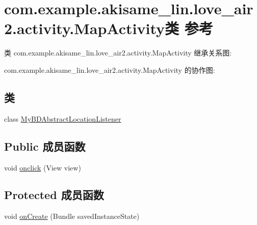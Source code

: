 \hypertarget{classcom_1_1example_1_1akisame__lin_1_1love__air2_1_1activity_1_1_map_activity}{}\section{com.\+example.\+akisame\+\_\+lin.\+love\+\_\+air2.\+activity.\+Map\+Activity类 参考}
\label{classcom_1_1example_1_1akisame__lin_1_1love__air2_1_1activity_1_1_map_activity}


类 com.\+example.\+akisame\+\_\+lin.\+love\+\_\+air2.\+activity.\+Map\+Activity 继承关系图\+:


com.\+example.\+akisame\+\_\+lin.\+love\+\_\+air2.\+activity.\+Map\+Activity 的协作图\+:
\subsection*{类}
\begin{DoxyCompactItemize}
\item 
class \mbox{\hyperlink{classcom_1_1example_1_1akisame__lin_1_1love__air2_1_1activity_1_1_map_activity_1_1_my_b_d_abstract_location_listener}{My\+B\+D\+Abstract\+Location\+Listener}}
\end{DoxyCompactItemize}
\subsection*{Public 成员函数}
\begin{DoxyCompactItemize}
\item 
void \mbox{\hyperlink{classcom_1_1example_1_1akisame__lin_1_1love__air2_1_1activity_1_1_map_activity_acb33a3b734a4d5c579d45641b6eb4db0}{onclick}} (View view)
\end{DoxyCompactItemize}
\subsection*{Protected 成员函数}
\begin{DoxyCompactItemize}
\item 
void \mbox{\hyperlink{classcom_1_1example_1_1akisame__lin_1_1love__air2_1_1activity_1_1_map_activity_ae2ff5b8dcc931505419f49a0a9c1b948}{on\+Create}} (Bundle saved\+Instance\+State)
\end{DoxyCompactItemize}
